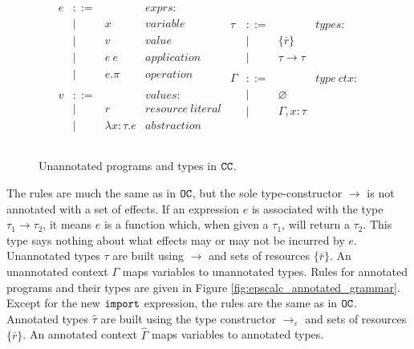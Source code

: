 \begin{figure}[h]
\vspace{-5pt}

\[
\begin{array}{lll}

\begin{array}{lllr}
e & ::= & ~ & exprs: \\
	& | & x & variable \\
	& | & v & value \\
	& | & e ~ e & application \\
	& | & e.\pi & operation \\
	&&\\

v & ::= & ~ & values: \\
	& | & r & resource~literal \\
	& | & \lambda x: \tau.e & abstraction \\
	&&\\
\end{array}

\begin{array}{lllr}

\tau & ::= & ~ & types: \\
		& | & \{ \bar r \} \\
		& | & \tau \rightarrow \tau \\ 
		&&\\

\Gamma & ::= & ~ & type~ctx: \\
				& | & \varnothing \\
				& | & \Gamma, x: \tau \\
				&&\\
				
\end{array}

\end{array}
\]

\vspace{-7pt}
\caption{Unannotated programs and types in $\mathtt{CC}$.}
\label{fig:epscalc_unannotated_grammar}
\end{figure}

The rules are much the same as in $\mathtt{OC}$, but the sole type-constructor $\rightarrow$ is not annotated with a set of effects. If an expression $e$ is associated with the type $\tau_1 \rightarrow \tau_2$, it means $e$ is a function which, when given a $\tau_1$, will return a $\tau_2$. This type says nothing about what effects may or may not be incurred by $e$. Unannotated types $\tau$ are built using $\rightarrow$ and sets of resources $\{ \bar r \}$. An unannotated context $\Gamma$ maps variables to unannotated types. Rules for annotated programs and their types are given in Figure \ref{fig:epscalc_annotated_grammar}. Except for the new $\mathtt{import}$ expression, the rules are the same as in $\mathtt{OC}$. Annotated types $\hat \tau$ are built using the type constructor $\rightarrow_{\varepsilon}$ and sets of resources $\{ \bar r \}$. An annotated context $\hat \Gamma$ maps variables to annotated types.


